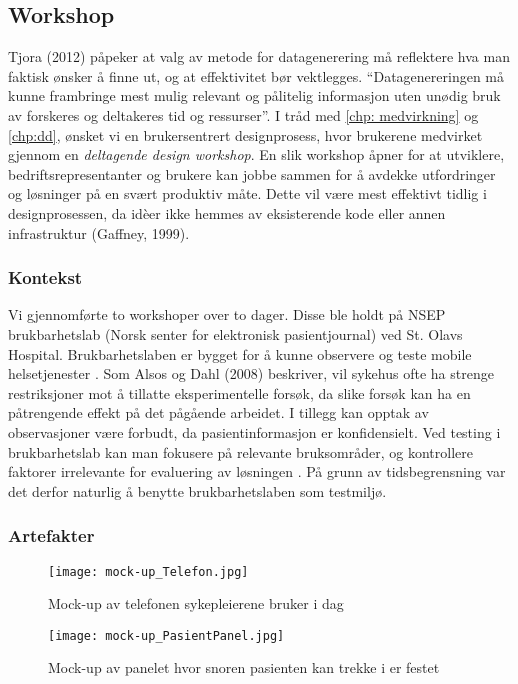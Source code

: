 \subsection{Workshop}
\label{workshops}

Tjora (2012) påpeker at valg av metode for datagenerering må reflektere hva man faktisk ønsker å finne ut, og at effektivitet bør vektlegges. “Datagenereringen må kunne frambringe mest mulig relevant og pålitelig informasjon uten unødig bruk av forskeres og deltakeres tid og ressurser”.
I tråd med \ref{chp: medvirkning} og \ref{chp:dd}, ønsket vi en brukersentrert designprosess, hvor brukerene medvirket gjennom en \emph{deltagende design workshop}.
En slik workshop åpner for at utviklere, bedriftsrepresentanter og brukere kan jobbe sammen for å avdekke utfordringer og løsninger på en svært produktiv måte. Dette vil være mest effektivt tidlig i designprosessen, da idèer ikke hemmes av eksisterende kode eller annen infrastruktur (Gaffney, 1999).

\subsubsection{Kontekst}
Vi gjennomførte to workshoper over to dager. Disse ble holdt på NSEP brukbarhetslab (Norsk senter for elektronisk pasientjournal) ved St. Olavs Hospital. Brukbarhetslaben er bygget for å kunne observere og teste mobile helsetjenester \cite{NSEP}.
Som Alsos og Dahl (2008) beskriver, vil sykehus ofte ha strenge restriksjoner mot å tillatte eksperimentelle forsøk, da slike forsøk kan ha en påtrengende effekt på det pågående arbeidet. I tillegg kan opptak av observasjoner være forbudt, da pasientinformasjon er konfidensielt. Ved testing i brukbarhetslab kan man fokusere på relevante bruksområder, og kontrollere faktorer irrelevante for evaluering av løsningen \cite{Alsos08}. På grunn av tidsbegrensning var det derfor naturlig å benytte brukbarhetslaben som testmiljø.   




\subsubsection{Artefakter}
\begin{figure}[H]
\centering
\texttt{[image: mock-up\_Telefon.jpg]}
\caption{Mock-up av telefonen sykepleierene bruker i dag}
\label{mock-up_Telefon}
\end{figure}

\begin{figure}[H]
\centering
\texttt{[image: mock-up\_PasientPanel.jpg]}
\caption{Mock-up av panelet hvor snoren pasienten kan trekke i er festet}
\label{mock-up_PasientPanel}
\end{figure}


